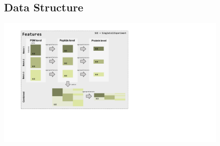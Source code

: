 \documentclass{article}
\begin{document}
\begin{multicols}{2}
\begin{minipage}[t]{\linewidth}
\end{minipage}

\noindent
\begin{minipage}[t]{\linewidth}
  \vspace{0.55cm}
  \section*{\huge Data Structure}
  \begin{center}
    \includegraphics[width=0.85\textwidth, trim={2.6cm 5cm 14cm 1cm},clip]{figs/Features.pdf}
  \end{center}
\end{minipage}


\noindent
\begin{minipage}[t]{\linewidth}
  \vspace{0.55cm}

\end{minipage}
\end{multicols}
\end{document}
